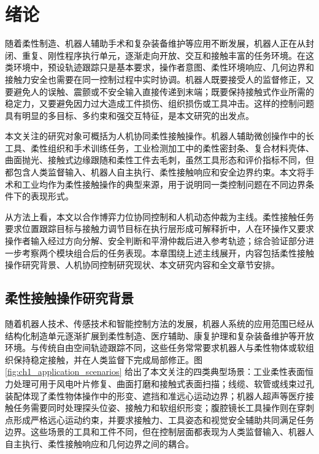 \chapter{绪论}
\label{chap:introduction}

随着柔性制造、机器人辅助手术和复杂装备维护等应用不断发展，机器人正在从封闭、重复、刚性程序执行单元，逐渐走向开放、交互和接触丰富的任务环境。在这类环境中，预设轨迹跟踪只是基本要求，操作者意图、柔性环境响应、几何边界和接触力安全也需要在同一控制过程中实时协调。机器人既要接受人的监督修正，又要避免人的误触、震颤或不安全输入直接传递到末端；既要保持接触式作业所需的稳定力，又要避免因力过大造成工件损伤、组织损伤或工具冲击。这样的控制问题具有明显的多目标、多约束和强交互特征，是本文研究的出发点。

本文关注的研究对象可概括为人机协同柔性接触操作。机器人辅助微创操作中的长工具、柔性组织和手术训练任务，工业检测加工中的柔性密封条、复合材料壳体、曲面抛光、接触式边缘跟随和柔性工件去毛刺，虽然工具形态和评价指标不同，但都包含人类监督输入、机器人自主执行、柔性接触响应和安全边界约束。本文将手术和工业均作为柔性接触操作的典型来源，用于说明同一类控制问题在不同边界条件下的表现形式。

从方法上看，本文以合作博弈力位协同控制和人机动态仲裁为主线。柔性接触任务要求位置跟踪目标与接触力调节目标在执行层形成可解释折中，人在环操作又要求操作者输入经过方向分解、安全判断和平滑仲裁后进入参考轨迹；综合验证部分进一步考察两个模块组合后的任务表现。本章围绕上述主线展开，内容包括柔性接触操作研究背景、人机协同控制研究现状、本文研究内容和全文章节安排。

\section{柔性接触操作研究背景}
\label{sec:ch1_background}

随着机器人技术、传感技术和智能控制方法的发展，机器人系统的应用范围已经从结构化制造单元逐渐扩展到柔性制造、医疗辅助、康复护理和复杂装备维护等开放环境。与传统自由空间轨迹跟踪不同，这些任务常常要求机器人与柔性物体或软组织保持稳定接触，并在人类监督下完成局部修正。图\ref{fig:ch1_application_scenarios} 给出了本文关注的四类典型场景：工业柔性表面恒力处理可用于风电叶片修复、曲面打磨和接触式表面扫描\cite{alt2024robogrind,wijayarathne2023deformable}；线缆、软管或线束过孔装配体现了柔性物体操作中的形变、遮挡和准远心运动边界\cite{wilson2023cable}；机器人超声等医疗接触任务需要同时处理探头位姿、接触力和软组织形变\cite{jiang2021deformation}；腹腔镜长工具操作则在穿刺点形成严格远心运动约束，并要求接触力、工具姿态和视觉安全辅助共同满足任务边界\cite{saeidi2022star,chen2023markerless,ishida2024force}。这些场景的工具和工件不同，但在控制层面都表现为人类监督输入、机器人自主执行、柔性接触响应和几何边界之间的耦合。

